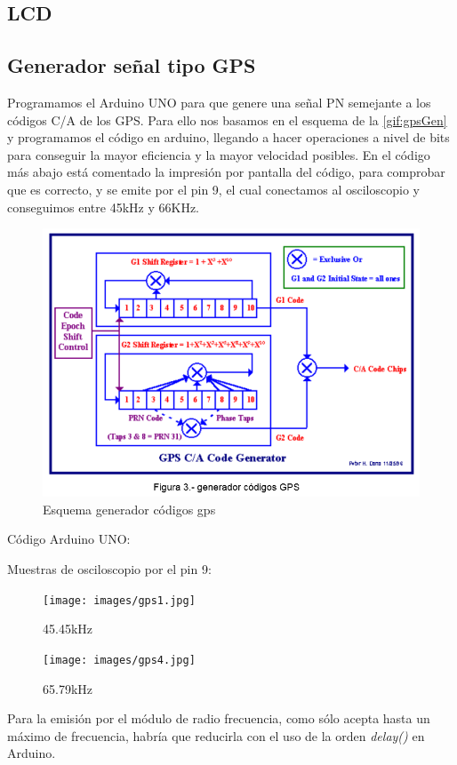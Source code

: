 \documentclass[]{article}
\begin{document}
\subsection{LCD}

\subsection{Generador señal tipo GPS}

Programamos el Arduino UNO para que genere una señal PN semejante a los códigos C/A de los GPS. Para ello nos basamos en el esquema de la \autoref{gif:gpsGen} y programamos el código en arduino, llegando a hacer operaciones a nivel de bits para conseguir la mayor eficiencia y la mayor velocidad posibles. En el código más abajo está comentado la impresión por pantalla del código, para comprobar que es correcto, y se emite por el pin 9, el cual conectamos al osciloscopio y conseguimos entre 45kHz y 66KHz.

\begin{figure}[h!]
	\centering
	\includegraphics[width=0.6\linewidth]{images/gpsGen.PNG}
	\caption{Esquema generador códigos gps}
	\label{fig:gpsGen}
\end{figure}

Código Arduino UNO:



Muestras de osciloscopio por el pin 9:

\begin{figure}[h!]
	\centering
	\texttt{[image: images/gps1.jpg]}
	\caption{45.45kHz}
	\label{fig:gps1}
\end{figure}

\begin{figure}[h!]
	\centering
	\texttt{[image: images/gps4.jpg]}
	\caption{65.79kHz}
	\label{fig:gps4}
\end{figure}

Para la emisión por el módulo de radio frecuencia, como sólo acepta hasta un máximo de frecuencia, habría que reducirla con el uso de la orden \textit{delay()} en Arduino.
\end{document}
